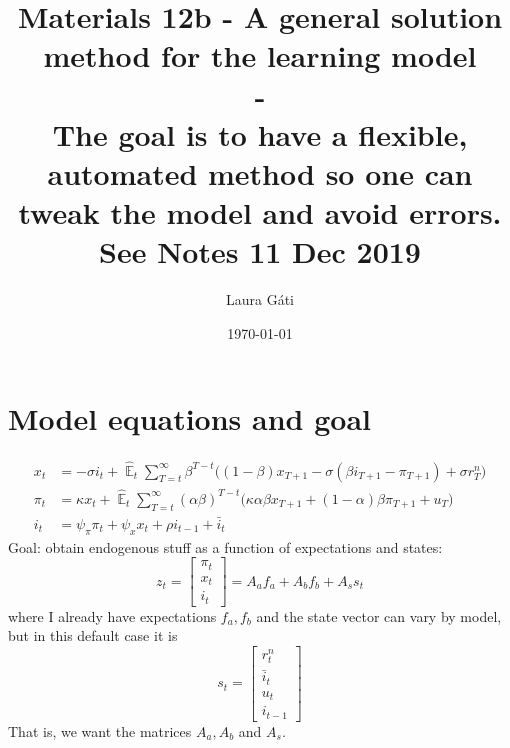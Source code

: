 \documentclass[11pt]{article}
\renewcommand{\[}{\begin{equation}}
\renewcommand{\]}{\end{equation}}
\DeclareMathOperator{\E}{\mathbb{E}}
\begin{document}
\linespread{1.0}

\title{Materials 12b - A general solution method for the learning model \\
- 
\\
\small{The goal is to have a flexible, automated method so one can tweak the model and avoid errors. \\See Notes 11 Dec 2019}}
\author{Laura G\'ati} 
\date{\today}
\maketitle




\section{Model equations and goal}
\begin{align}
x_t &=  -\sigma i_t +\hat{\E}_t \sum_{T=t}^{\infty} \beta^{T-t }\big( (1-\beta)x_{T+1} - \sigma(\beta i_{T+1} - \pi_{T+1}) +\sigma r_T^n \big)  \label{prestons18}  \\
\pi_t &= \kappa x_t +\hat{\E}_t \sum_{T=t}^{\infty} (\alpha\beta)^{T-t }\big( \kappa \alpha \beta x_{T+1} + (1-\alpha)\beta \pi_{T+1} + u_T\big) \label{prestons19}  \\
i_t &= \psi_{\pi}\pi_t + \psi_{x} x_t  + \rho i_{t-1} + \bar{i}_t \label{TR}
\end{align}
Goal: obtain endogenous stuff as a function of expectations and states:
\begin{equation}
z_t = \begin{bmatrix} \pi_t \\ x_t \\ i_t \end{bmatrix} = A_a f_{a} + A_b f_{b} + A_s s_t
\end{equation}
where I already have expectations $f_a, f_b$ and the state vector can vary by model, but in this default case it is \begin{equation}
s_t = \begin{bmatrix} r_t^n \\ \bar{i}_t \\ u_t \\ i_{t-1} \end{bmatrix}
\end{equation}
That is,  we want the matrices $A_a, A_b$ and $A_s$.
\end{document}
